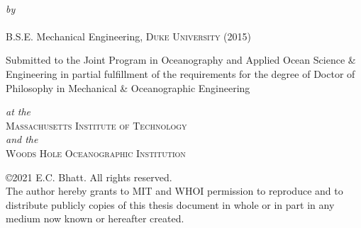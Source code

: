 
\def\signature#1#2{\par\noindent#1\dotfill\null\\*
  {\raggedleft #2\par}}

\makeatletter

\begin{titlepage}
  \begin{center}
    \begin{Large}
      \@title
    \end{Large}\\[0.1em]
    \emph{\footnotesize by}\\
    {\large \@author} \\[-0.25em]
    B.S.E. Mechanical Engineering, \textsc{Duke University} (2015) \\ [2em]
    \begin{singlespace}
    {Submitted to the Joint Program in Oceanography and Applied Ocean Science \& Engineering in partial fulfillment of the requirements for the degree of Doctor of Philosophy in Mechanical \& Oceanographic Engineering} \\
    \end{singlespace}
    \emph{\footnotesize at the}\\
    {\large \textsc{Massachusetts Institute of Technology}} \\
    \emph{\footnotesize and the}\\
    {\large \textsc{Woods Hole Oceanographic Institution}} \\ [2em]
    \begin{singlespace}
    {\copyright2021 E.C. Bhatt. All rights reserved. \\ The author hereby grants to MIT and WHOI permission to reproduce and to distribute publicly copies of this thesis document in whole or in part in any medium now known or hereafter created.} \\ [2em]


\end{singlespace}
\end{center}
\end{titlepage}
